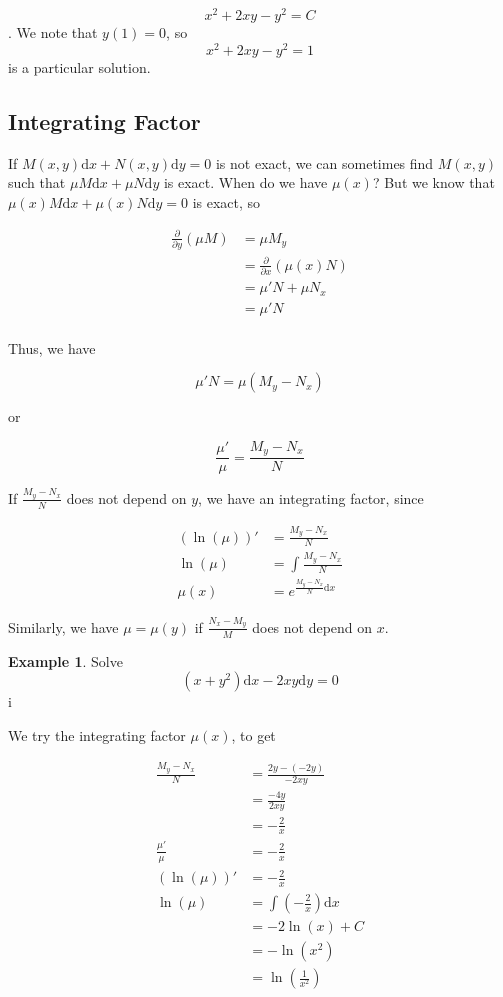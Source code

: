 \documentclass[11pt]{article}
\theoremstyle{plain} %
\theoremstyle{definition}
\theoremstyle{example}
\newtheorem*{example}{Example}
\theoremstyle{remark}
\begin{document}
$$x^2+2xy-y^2=C$$. We note that $y(1)=0$, so $$x^2+2xy-y^2=1$$ is a particular solution.

\subsection{Integrating Factor}
If $M(x,y)\mathrm d x + N(x,y) \mathrm d y = 0$ is not exact, we can sometimes find $M(x,y)$ such that $\mu M\mathrm d x + \mu N \mathrm d y$ is exact. When do we have $\mu(x)$? But we know that $\mu(x) M\mathrm d x + \mu (x) N \mathrm d y=0$ is exact, so

\begin{align*}
	\frac{\partial}{\partial y}(\mu M) &= \mu M_y\\
	&= \frac{\partial}{\partial x} \left(\mu (x)N\right)\\
	&= \mu ' N + \mu N_x \\
	&= \mu 'N \\
\end{align*}

Thus, we have 














$$\mu 'N = \mu(M_y-N_x)$$

or

$$\frac{\mu '}{\mu} = \frac{M_y-N_x}{N}$$

If $\frac{M_y-N_x}{N}$ does not depend on $y$, we have an integrating factor, since

\begin{align*}
	\left(\ln(\mu)\right)' &= \frac{M_y-N_x}{N}\\
	\ln(\mu) &= \int \frac{M_y-N_x}{N}\\
	\mu(x) &= e^{\frac{M_y-N_x}{N} \mathrm d x}
\end{align*}

Similarly, we have $\mu = \mu (y)$ if $\frac{N_x-M_y}{M}$ does not depend on $x$. 



\begin{example}
Solve $$\left(x+y^2\right)\mathrm d x -2xy\mathrm d y = 0$$i
\end{example}

We try the integrating factor $\mu(x)$, to get 

\begin{align*}
	\frac{M_y-N_x}{N} &= \frac{2y-(-2y)}{-2xy}\\
	&= \frac{-4y}{2xy} \\
	&= -\frac{2}{x}\\
	\frac{\mu '}{\mu} &= -\frac{2}{x}\\
	(\ln(\mu))' &= -\frac{2}{x}\\
	\ln(\mu) &= \int \left(-\frac{2}{x}\right)\mathrm d x \\
	&= -2\ln(x)+C\\
	&= -\ln(x^2) \\
	&= \ln\left(\frac{1}{x^2}\right)
	\end{align*}
	
\end{document}
